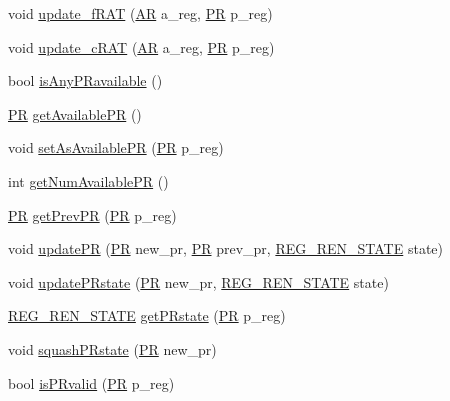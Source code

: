 \begin{DoxyCompactItemize}
\item 
void \hyperlink{classo3__registerRename_ac29d3ca88b64d065d8f52b4384895c4b}{update\_\-fRAT} (\hyperlink{global_2global_8h_a735ca3cb7fa17e60af6701a846722516}{AR} a\_\-reg, \hyperlink{global_2global_8h_a54dcae2ba04c76c12afe113b706bd4dc}{PR} p\_\-reg)
\item 
void \hyperlink{classo3__registerRename_af8f4e3c178f20fbee9a17d5781cd8f84}{update\_\-cRAT} (\hyperlink{global_2global_8h_a735ca3cb7fa17e60af6701a846722516}{AR} a\_\-reg, \hyperlink{global_2global_8h_a54dcae2ba04c76c12afe113b706bd4dc}{PR} p\_\-reg)
\item 
bool \hyperlink{classo3__registerRename_a500dec17b068c33a1813786cb6727273}{isAnyPRavailable} ()
\item 
\hyperlink{global_2global_8h_a54dcae2ba04c76c12afe113b706bd4dc}{PR} \hyperlink{classo3__registerRename_a314a54fa930b7fa3de55c8b66e46061b}{getAvailablePR} ()
\item 
void \hyperlink{classo3__registerRename_aae9d93d826236d42ba090d1d53ba62af}{setAsAvailablePR} (\hyperlink{global_2global_8h_a54dcae2ba04c76c12afe113b706bd4dc}{PR} p\_\-reg)
\item 
int \hyperlink{classo3__registerRename_af3dacac6db9095e6aa73da550e2c71bc}{getNumAvailablePR} ()
\item 
\hyperlink{global_2global_8h_a54dcae2ba04c76c12afe113b706bd4dc}{PR} \hyperlink{classo3__registerRename_ab76f162d8e2a6228404670bda2bad322}{getPrevPR} (\hyperlink{global_2global_8h_a54dcae2ba04c76c12afe113b706bd4dc}{PR} p\_\-reg)
\item 
void \hyperlink{classo3__registerRename_a6e6d2444676ba95b85d0a84908f6e5fe}{updatePR} (\hyperlink{global_2global_8h_a54dcae2ba04c76c12afe113b706bd4dc}{PR} new\_\-pr, \hyperlink{global_2global_8h_a54dcae2ba04c76c12afe113b706bd4dc}{PR} prev\_\-pr, \hyperlink{global_2global_8h_aa58e77d5a6caaeed4d4bd6f5b30f3ee7}{REG\_\-REN\_\-STATE} state)
\item 
void \hyperlink{classo3__registerRename_a6e6c35b5b477597e3eafed6def8c574b}{updatePRstate} (\hyperlink{global_2global_8h_a54dcae2ba04c76c12afe113b706bd4dc}{PR} new\_\-pr, \hyperlink{global_2global_8h_aa58e77d5a6caaeed4d4bd6f5b30f3ee7}{REG\_\-REN\_\-STATE} state)
\item 
\hyperlink{global_2global_8h_aa58e77d5a6caaeed4d4bd6f5b30f3ee7}{REG\_\-REN\_\-STATE} \hyperlink{classo3__registerRename_a62accbd82ef62f8c411975e824d644af}{getPRstate} (\hyperlink{global_2global_8h_a54dcae2ba04c76c12afe113b706bd4dc}{PR} p\_\-reg)
\item 
void \hyperlink{classo3__registerRename_aebbf6e056ef5e4c50081db9dc1817a2b}{squashPRstate} (\hyperlink{global_2global_8h_a54dcae2ba04c76c12afe113b706bd4dc}{PR} new\_\-pr)
\item 
bool \hyperlink{classo3__registerRename_a66e4f1bfb4aef291e88933aad6c46ce6}{isPRvalid} (\hyperlink{global_2global_8h_a54dcae2ba04c76c12afe113b706bd4dc}{PR} p\_\-reg)
\end{DoxyCompactItemize}


